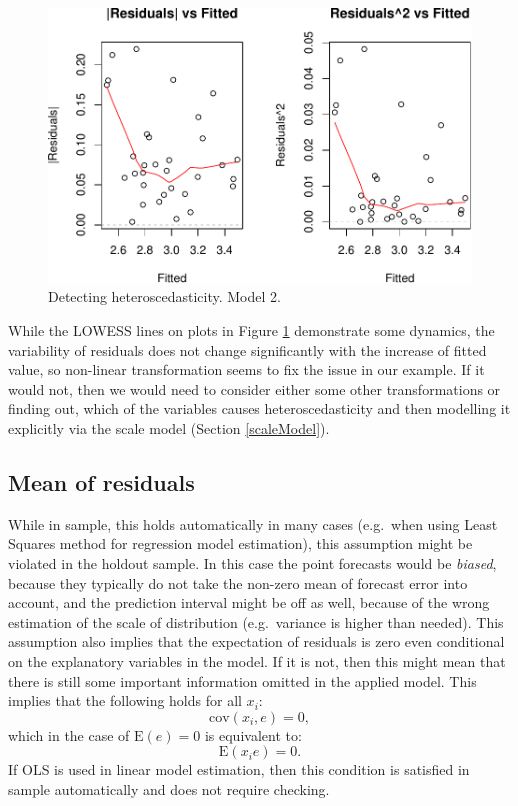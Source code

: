 \documentclass[
]{book}
\theoremstyle{definition}
\theoremstyle{definition}
\theoremstyle{definition}
\theoremstyle{definition}
\theoremstyle{remark}
\begin{document}
\begin{figure}
\centering
\includegraphics{Svetunkov---Statistics-for-Business-Analytics_files/figure-latex/diagnostics11-1.pdf}
\caption{\label{fig:diagnostics11}Detecting heteroscedasticity. Model 2.}
\end{figure}

While the LOWESS lines on plots in Figure \ref{fig:diagnostics11} demonstrate some dynamics, the variability of residuals does not change significantly with the increase of fitted value, so non-linear transformation seems to fix the issue in our example. If it would not, then we would need to consider either some other transformations or finding out, which of the variables causes heteroscedasticity and then modelling it explicitly via the scale model (Section \ref{scaleModel}).

\hypertarget{assumptionsResidualsAreIIDMean}{%
\subsection{Mean of residuals}\label{assumptionsResidualsAreIIDMean}}

While in sample, this holds automatically in many cases (e.g.~when using Least Squares method for regression model estimation), this assumption might be violated in the holdout sample. In this case the point forecasts would be \emph{biased}, because they typically do not take the non-zero mean of forecast error into account, and the prediction interval might be off as well, because of the wrong estimation of the scale of distribution (e.g.~variance is higher than needed). This assumption also implies that the expectation of residuals is zero even conditional on the explanatory variables in the model. If it is not, then this might mean that there is still some important information omitted in the applied model. This implies that the following holds for all \(x_i\):
\begin{equation*}
  \mathrm{cov}(x_i, e) = 0 ,
\end{equation*}
which in the case of \(\mathrm{E}(e)=0\) is equivalent to:
\begin{equation*}
  \mathrm{E}(x_i e) = 0 .
\end{equation*}
If OLS is used in linear model estimation, then this condition is satisfied in sample automatically and does not require checking.
\end{document}
